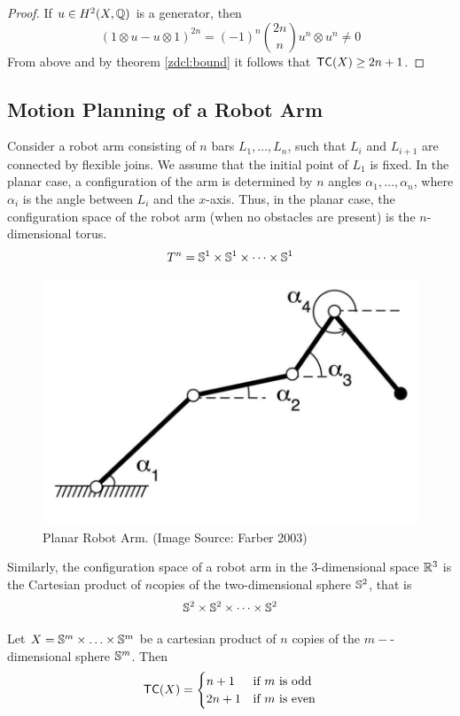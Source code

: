 \begin{proof}
    If $u \in H^2(X, \mathbb{Q})$ is a generator, then
    \[
        (1 \otimes u - u \otimes 1)^{2n} = (-1)^n \binom{2n}{n} u^n \otimes u^n \neq 0
    \]
    From above and by theorem \ref{zdcl:bound} it follows that $\textsf{TC}(X) \ge 2n + 1$.
\end{proof}


\subsection{Motion Planning of a Robot Arm}
Consider a robot arm consisting of $n$ bars $L_1, \ldots, L_n$, such that $L_i$ and $L_{i+1}$ are connected by flexible joins. 
We assume that the initial point of $L_1$ is fixed. 
In the planar case, a configuration of the arm is determined by $n$ angles $\alpha_1, \ldots, \alpha_n$, where $\alpha_i$ is the angle between $L_i$ and the $x$-axis. 
Thus, in the planar case, the configuration space of the robot arm (when no obstacles are present) is the $n$-dimensional torus.
\[
    T^n = \mathbb{S}^1 \times \mathbb{S}^1 \times \cdots \times \mathbb{S}^1
\]

\begin{figure}[h]
    \centering
    \includegraphics[scale=0.5]{images/planar-robot-arm.png}
    \caption{Planar Robot Arm. (Image Source: Farber 2003)}
\end{figure}

Similarly, the configuration space of a robot arm in the $3$-dimensional space $\mathbb{R}^3$ is the Cartesian product of $n$copies of the two-dimensional sphere $\mathbb{S}^2$, that is
\[
    \mathbb{S}^2 \times \mathbb{S}^2 \times \cdots \times \mathbb{S}^2
\]

\begin{thm}\cite{farber2003topological}
    Let $X  = \mathbb{S}^m \times \ldots \times \mathbb{S}^m$ be a cartesian product of $n$ copies of the $m-$-dimensional sphere $\mathbb{S}^m$. Then
    \[
        \textsf{TC}(X) = \begin{cases}
            n + 1  & \text{if $m$ is odd}  \\
            2n + 1 & \text{if $m$ is even}
        \end{cases}
    \]
\end{thm}

